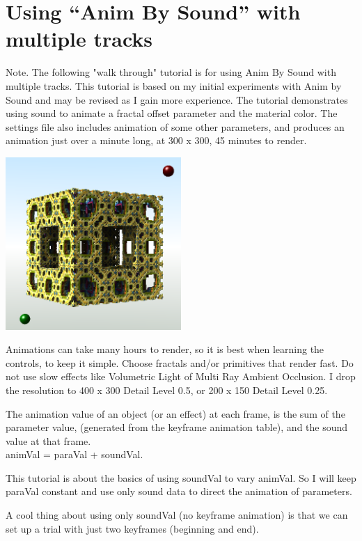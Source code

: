 \section{Using ``Anim By Sound'' with multiple
tracks}\label{using-anim-by-sound-with-multiple-tracks}

Note. The following "walk through" tutorial is for using Anim By Sound
with multiple tracks. This tutorial is based on my initial experiments
with Anim by Sound and may be revised as I gain more experience. The
tutorial demonstrates using sound to animate a fractal offset parameter
and the material color. The settings file also includes animation of
some other parameters, and produces an animation just over a minute
long, at 300 x 300, 45 minutes to render.

\includegraphics[width=2.63000in,height=2.58000in]{img/sound/media/image1.png}

Animations can take many hours to render, so it is best when learning
the controls, to keep it simple. Choose fractals and/or primitives that
render fast. Do not use slow effects like Volumetric Light of Multi Ray
Ambient Occlusion. I drop the resolution to 400 x 300 Detail Level 0.5,
or 200 x 150 Detail Level 0.25.

The animation value of an object (or an effect) at each frame, is the
sum of the parameter value, (generated from the keyframe animation
table), and the sound value at that frame.\\
animVal = paraVal + soundVal.

This tutorial is about the basics of using soundVal to vary animVal. So
I will keep paraVal constant and use only sound data to direct the
animation of parameters.

A cool thing about using only soundVal (no keyframe animation) is that
we can set up a trial with just two keyframes (beginning and end).

